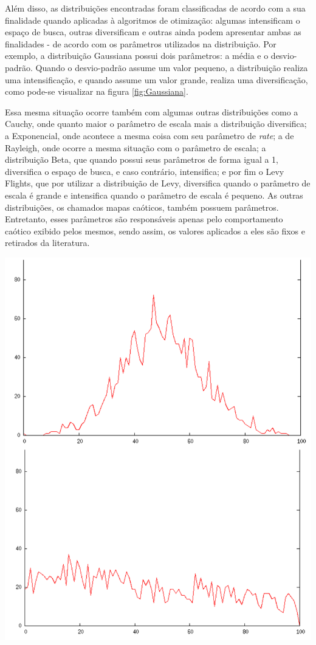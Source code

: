
Além disso, as distribuições encontradas foram classificadas de acordo com a sua finalidade quando aplicadas à algoritmos de otimização: algumas intensificam o espaço de busca, outras diversificam e outras ainda podem apresentar ambas as finalidades - de acordo com os parâmetros utilizados na distribuição. Por exemplo, a distribuição Gaussiana possui dois parâmetros: a média e o desvio-padrão. Quando o desvio-padrão assume um valor pequeno, a distribuição realiza uma intensificação, e quando assume um valor grande, realiza uma diversificação, como pode-se visualizar na figura \ref{fig:Gaussiana}. 

Essa mesma situação ocorre também com algumas outras distribuições como a Cauchy, onde quanto maior o parâmetro de escala mais a distribuição diversifica; a Exponencial, onde acontece a mesma coisa com seu parâmetro de \textit{rate}; a de Rayleigh, onde ocorre a mesma situação com o parâmetro de escala; a distribuição Beta, que quando possui seus parâmetros de forma igual a 1, diversifica o espaço de busca, e caso contrário, intensifica; e por fim o Levy Flights, que por utilizar a distribuição de Levy, diversifica quando o parâmetro de escala é grande e intensifica quando o parâmetro de escala é pequeno. As outras distribuições, os chamados mapas caóticos, também possuem parâmetros. Entretanto, esses parâmetros são responsáveis apenas pelo comportamento caótico exibido pelos mesmos, sendo assim, os valores aplicados a eles são fixos e retirados da literatura.

{
    \centering
    \includegraphics[width=0.7\linewidth]{figuras/gaussian.png}
    \label{fig:Gaussiana}
}

